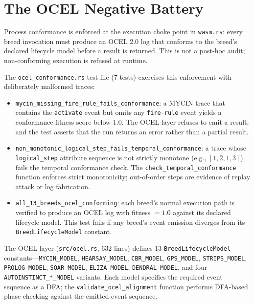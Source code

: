 \section{The OCEL Negative Battery}
\label{sec:ocel-negative}

Process conformance is enforced at the execution choke point in \texttt{wasm.rs}: every breed
invocation must produce an OCEL 2.0 log that conforms to the breed's declared lifecycle model
before a result is returned. This is not a post-hoc audit; non-conforming execution is refused
at runtime.

The \texttt{ocel\_conformance.rs} test file (7 tests) exercises this enforcement with
deliberately malformed traces:

\begin{itemize}
  \item \texttt{mycin\_missing\_fire\_rule\_fails\_conformance}: a MYCIN trace that contains
    the \texttt{activate} event but omits any \texttt{fire-rule} event yields a conformance
    fitness score below 1.0. The OCEL layer refuses to emit a result, and the test asserts
    that the run returns an error rather than a partial result.

  \item \texttt{non\_monotonic\_logical\_step\_fails\_temporal\_conformance}: a trace whose
    \texttt{logical\_step} attribute sequence is not strictly monotone (e.g.,
    $[1, 2, 1, 3]$) fails the temporal conformance check. The \texttt{check\_temporal\_conformance}
    function enforces strict monotonicity; out-of-order steps are evidence of replay attack
    or log fabrication.

  \item \texttt{all\_13\_breeds\_ocel\_conforming}: each breed's normal execution path is
    verified to produce an OCEL log with fitness $= 1.0$ against its declared lifecycle model.
    This test fails if any breed's event emission diverges from its \texttt{BreedLifecycleModel}
    constant.
\end{itemize}

The OCEL layer (\texttt{src/ocel.rs}, 632 lines) defines 13 \texttt{BreedLifecycleModel}
constants---\texttt{MYCIN\_MODEL}, \texttt{HEARSAY\_MODEL}, \texttt{CBR\_MODEL},
\texttt{GPS\_MODEL}, \texttt{STRIPS\_MODEL}, \texttt{PROLOG\_MODEL}, \texttt{SOAR\_MODEL},
\texttt{ELIZA\_MODEL}, \texttt{DENDRAL\_MODEL}, and four \texttt{AUTOINSTINCT\_*\_MODEL}
variants. Each model specifies the required event sequence as a DFA; the
\texttt{validate\_ocel\_alignment} function performs DFA-based phase checking against the
emitted event sequence.

